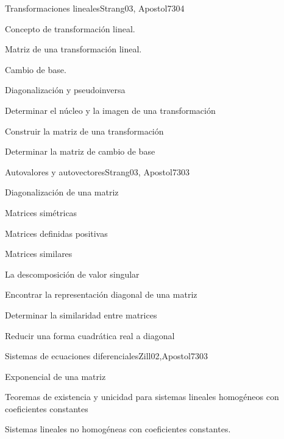 \begin{syllabus}
\begin{unit}{Transformaciones lineales}{}{Strang03, Apostol73}{0}{4}
\begin{topics}
      \item Concepto de transformación lineal.
      \item Matriz de una transformación lineal.
      \item Cambio de base.
      \item Diagonalización y pseudoinversa
   \end{topics}

   \begin{learningoutcomes}
      \item Determinar el núcleo y la imagen de una transformación
      \item Construir la matriz de una transformación
      \item Determinar la matriz de cambio de base
      \end{learningoutcomes}
\end{unit}

\begin{unit}{Autovalores y autovectores}{}{Strang03, Apostol73}{0}{3}
\begin{topics}
      \item Diagonalización de una matriz
      \item Matrices simétricas
      \item Matrices definidas positivas
      \item Matrices similares
      \item La descomposición de valor singular
  \end{topics}

   \begin{learningoutcomes}
      \item Encontrar la representación diagonal de una matriz
      \item Determinar la similaridad entre matrices
      \item Reducir una forma cuadrática real a diagonal
   \end{learningoutcomes}
\end{unit}

\begin{unit}{Sistemas de ecuaciones diferenciales}{}{Zill02,Apostol73}{0}{3}
\begin{topics}
      \item Exponencial de una matriz
      \item Teoremas de existencia y unicidad para sistemas lineales homogéneos con coeficientes constantes
      \item Sistemas lineales no homogéneas con coeficientes constantes.
    \end{topics}


\end{unit}
\end{syllabus}
